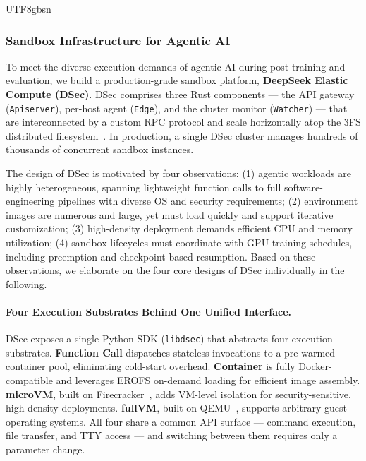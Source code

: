 \documentclass[11pt, a4paper, logo, copyright, nonumbering]{deepseek}
\begin{document}
\begin{CJK*}{UTF8}{gbsn}
\subsubsection{Sandbox Infrastructure for Agentic AI} 
\label{sec:dsec} 
 
To meet the diverse execution demands of agentic AI during post-training and evaluation, we build a production-grade sandbox platform, \textbf{DeepSeek Elastic Compute (DSec)}. 
DSec comprises three Rust components --- the API gateway (\texttt{Apiserver}), per-host agent (\texttt{Edge}), and the cluster monitor (\texttt{Watcher}) --- that are interconnected by a custom RPC protocol and scale horizontally atop the 3FS distributed filesystem~\citep{ds3fs}. 
In production, a single DSec cluster manages hundreds of thousands of concurrent sandbox instances. 
 
The design of DSec is motivated by four observations:
(1) agentic workloads are highly heterogeneous, spanning lightweight function calls to full software-engineering pipelines with diverse OS and security requirements; 
(2) environment images are numerous and large, yet must load quickly and support iterative customization; 
(3) high-density deployment demands efficient CPU and memory utilization; 
(4) sandbox lifecycles must coordinate with GPU training schedules, including preemption and checkpoint-based resumption. 
Based on these observations, we elaborate on the four core designs of DSec individually in the following.

\paragraph{Four Execution Substrates Behind One Unified Interface.}
DSec exposes a single Python SDK (\texttt{libdsec}) that abstracts four execution substrates. 
\textbf{Function Call} dispatches stateless invocations to a pre-warmed container pool, eliminating cold-start overhead.
\textbf{Container} is fully Docker-compatible and leverages EROFS \citep{erofs} on-demand loading for efficient image assembly.
\textbf{microVM}, built on Firecracker~\citep{firecracker}, adds VM-level isolation for security-sensitive, high-density deployments.
\textbf{fullVM}, built on QEMU~\citep{qemu}, supports arbitrary guest operating systems. 
All four share a common API surface --- command execution, file transfer, and TTY access --- and switching between them requires only a parameter change.


\end{CJK*}
\end{document}
